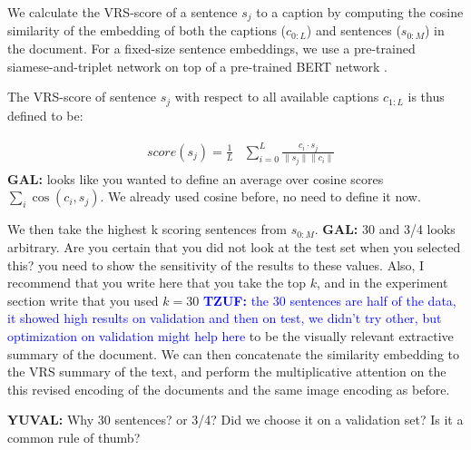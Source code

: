 \documentclass[11pt,a4paper]{article}
\newcommand\gal[1]{\textcolor{bright}{\textbf{GAL:} #1 }}
\newcommand\yuval[1]{\textcolor{darkpink}{\textbf{YUVAL:} #1 }}
\newcommand\tzuf[1]{\textcolor{blue}{\textbf{TZUF:} #1 }}
\begin{document}


We calculate the VRS-score of a sentence $s_j$ to a caption by computing the cosine similarity of the embedding of both the captions ($c_{0:L}$) and sentences ($s_{0:M}$) in the document. For a fixed-size sentence embeddings, we use a pre-trained siamese-and-triplet network \citep{reimers2019sentence, Schroff_2015_CVPR} on top of a pre-trained BERT network  \cite{devlin2019bert}.


The VRS-score of sentence $s_j$ with respect to all available captions   $c_{1:L}$  is thus defined to be:


\begin{equation}
\begin{aligned}
\begin{split}
\label{eq:score}
&score(s_j)=  \frac{1}{L}
&\sum_{i=0}^{L} \frac{c_i\cdot s_j}{\| s_j\|\| c_i\| }
\end{split}
\end{aligned}
\end{equation}
\gal{looks like you wanted to define an average over cosine scores $\sum_i\cos(c_i, s_j)$. We already used cosine before, no need to define it now. }


We then take the highest k scoring sentences from \(s_{0:M}\). \gal{30 and 3/4 looks arbitrary. Are you certain that you did not look at the test set when you selected this? you need to show the sensitivity of the results to these values. Also, I recommend that you write here that you take the top $k$, and in the experiment section write that you used $k=30$} \tzuf{the 30 sentences are half of the data, it showed high results on validation and then on test, we didn't try other, but optimization on validation might help here} to be the visually relevant extractive summary of the document. We can then concatenate the similarity embedding to the VRS summary of the text, and perform the multiplicative attention on the this  revised encoding of the documents and the same image encoding as before.\par
\yuval{Why 30 sentences? or 3/4? Did we choose it on a validation set? Is it a common rule of thumb?}
\end{document}
